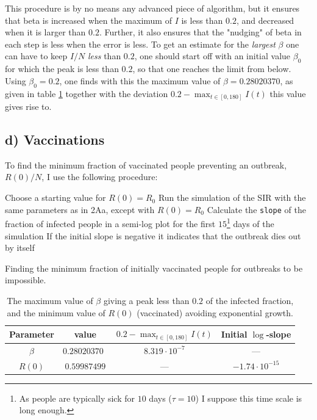 This procedure is by no means any advanced piece of algorithm, but it ensures that beta is increased when the maximum of $I$ is less than $0.2$, and decreased when it is larger than $0.2$. Further, it also ensures that the "nudging" of beta in each step is less when the error is less. To get an estimate for the \textit{largest} $\beta$ one can have to keep $I/N$ \textit{less} than $0.2$, one should start off with an initial value $\beta_0$ for which the peak is less than $0.2$, so that one reaches the limit from below. Using $\beta_0 = 0.2$, one finds with this the maximum value of $\beta = 0.28020370$, as given in table \ref{tab:2Acd} together with the deviation $0.2 - \max_{t\in[0,180]} I(t)$ this value gives rise to.  



\subsection{d) Vaccinations}

To find the minimum fraction of vaccinated people preventing an outbreak, $R(0)/N$, I use the following procedure:

\begin{algorithm}[H]
	Choose a starting value for $R(0) = R_0$\;
	Run the simulation of the SIR with the same parameters as in 2Aa, except with $R(0) = R_0$ \;
	Calculate the \texttt{slope} of the fraction of infected people in a semi-log plot for the first $15$\footnote{As people are typically sick for $10$ days ($\tau = 10$) I suppose this time scale is long enough.} days of the simulation\;
	If the initial slope is negative it indicates that the outbreak dies out by itself\;
	\caption{Finding the minimum fraction of initially vaccinated people for outbreaks to be impossible.}
\end{algorithm} 

\begin{table}[htb]
	\centering
	\caption{The maximum value of $\beta$ giving a peak less than $0.2$ of the infected fraction, and the minimum value of $R(0)$ (vaccinated) avoiding exponential growth.}
	\begin{tabular}{cccc}
		\toprule
		Parameter & value & $0.2 - \max_{t\in[0,180]} I(t)$ & Initial $\log$-slope \\
		\midrule
		$\beta$ & $0.28020370$ & $8.319\cdot 10^{-7}$ & --- \\
		$R(0)$  & $0.59987499$ & --- & $-1.74\cdot 10^{-15}$ \\
		\bottomrule
	\end{tabular}
	\label{tab:2Acd}
\end{table}


\clearpage
